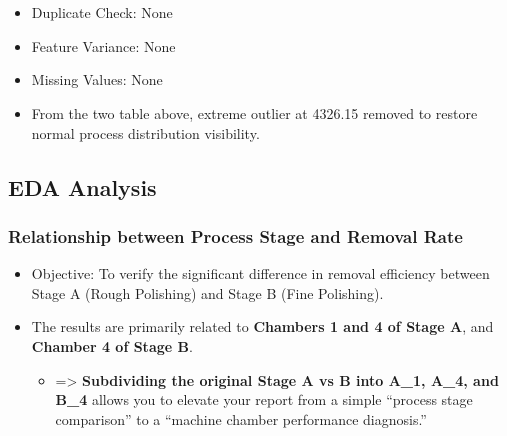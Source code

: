 \documentclass[11pt]{article}
\providecommand{\tightlist}{%
      \setlength{\itemsep}{0pt}\setlength{\parskip}{0pt}}
\begin{document}
    \begin{center}
    \end{center}
    { \hspace*{\fill} \\}
    
    \begin{center}
    \end{center}
    { \hspace*{\fill} \\}
    
    \begin{itemize}
\tightlist
\item
  Duplicate Check: None
\item
  Feature Variance: None
\item
  Missing Values: None
\item
  From the two table above, extreme outlier at 4326.15 removed to
  restore normal process distribution visibility.
\end{itemize}

    \subsection{EDA Analysis}\label{eda-analysis}

    \subsubsection{Relationship between Process Stage and Removal
Rate}\label{relationship-between-process-stage-and-removal-rate}

\begin{itemize}
\tightlist
\item
  Objective: To verify the significant difference in removal efficiency
  between Stage A (Rough Polishing) and Stage B (Fine Polishing).
\item
  The results are primarily related to \textbf{Chambers 1 and 4 of Stage
  A}, and \textbf{Chamber 4 of Stage B}.

  \begin{itemize}
  \tightlist
  \item
    =\textgreater{} \textbf{Subdividing the original Stage A vs B into
    A\_1, A\_4, and B\_4} allows you to elevate your report from a
    simple ``process stage comparison'' to a ``machine chamber
    performance diagnosis.''
  \end{itemize}
\end{itemize}
\end{document}
